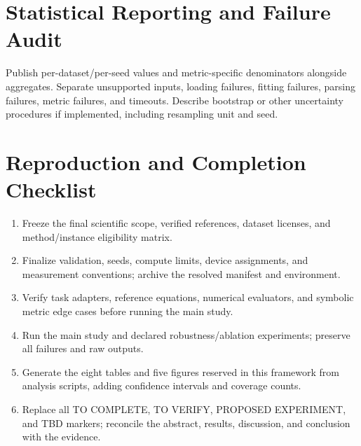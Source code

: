\documentclass[11pt,a4paper]{article}
\begin{document}
\section{Statistical Reporting and Failure Audit}
Publish per-dataset/per-seed values and metric-specific denominators alongside
aggregates. Separate unsupported inputs, loading failures, fitting failures,
parsing failures, metric failures, and timeouts. Describe bootstrap or other
uncertainty procedures if implemented, including resampling unit and seed.

\section{Reproduction and Completion Checklist}
\begin{enumerate}
  \item Freeze the final scientific scope, verified references, dataset licenses,
  and method/instance eligibility matrix.
  \item Finalize validation, seeds, compute limits, device assignments, and
  measurement conventions; archive the resolved manifest and environment.
  \item Verify task adapters, reference equations, numerical evaluators, and
  symbolic metric edge cases before running the main study.
  \item Run the main study and declared robustness/ablation experiments;
  preserve all failures and raw outputs.
  \item Generate the eight tables and five figures reserved in this framework
  from analysis scripts, adding confidence intervals and coverage counts.
  \item Replace all TO COMPLETE, TO VERIFY, PROPOSED EXPERIMENT, and TBD markers;
  reconcile the abstract, results, discussion, and conclusion with the evidence.
\end{enumerate}
\end{document}
